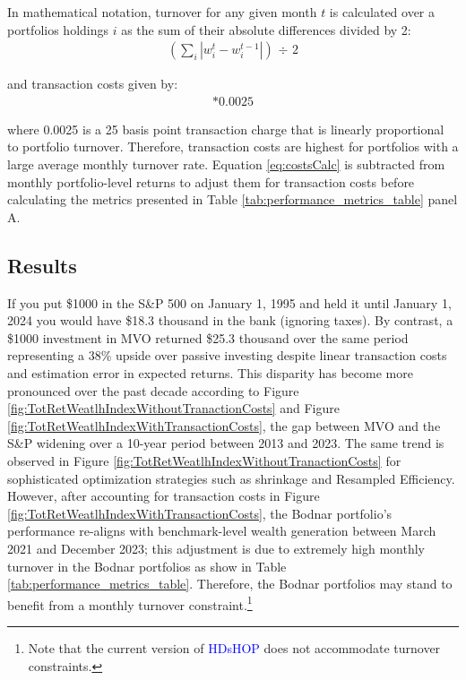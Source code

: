 \documentclass[12pt,letterpaper]{article}
\begin{document}
\clearpage

In mathematical notation, turnover for any given month $t$ is calculated over a portfolios holdings $i$ as the sum of their absolute differences divided by 2:
\begin{align}
(\sum_{i} | w_i^{t} - w_i^{t-1} |) \text{ ÷ } 2
\label{eq:turnoverCalc}
\end{align}

and transaction costs given by:
\begin{align}
[(\sum_{i} | w_i^{t} - w_i^{t-1} |) \text{ ÷ } 2]*0.0025
\label{eq:costsCalc}
\end{align}

where 0.0025 is a 25 basis point transaction charge that is linearly proportional to portfolio turnover. Therefore, transaction costs are highest for portfolios with a large average monthly turnover rate. Equation \ref{eq:costsCalc} is subtracted from monthly portfolio-level returns to adjust them for transaction costs before calculating the metrics presented in Table \ref{tab:performance_metrics_table} panel A.

\subsection{Results}

If you put \$1000 in the S\&P 500 on January 1, 1995 and held it until January 1, 2024 you would have \$18.3 thousand in the bank (ignoring taxes). By contrast, a \$1000 investment in MVO returned \$25.3 thousand over the same period representing a 38\% upside over passive investing despite linear transaction costs and estimation error in expected returns. This disparity has become more pronounced over the past decade according to Figure \ref{fig:TotRetWeatlhIndexWithoutTranactionCosts} and Figure \ref{fig:TotRetWeatlhIndexWithTransactionCosts}, the gap between MVO and the S\&P widening over a 10-year period between 2013 and 2023. The same trend is observed in Figure \ref{fig:TotRetWeatlhIndexWithoutTranactionCosts} for sophisticated optimization strategies such as shrinkage and Resampled Efficiency. However, after accounting for transaction costs in Figure \ref{fig:TotRetWeatlhIndexWithTransactionCosts}, the Bodnar portfolio's performance re-aligns with benchmark-level wealth generation between March 2021 and December 2023; this adjustment is due to extremely high monthly turnover in the Bodnar portfolios as show in Table \ref{tab:performance_metrics_table}. Therefore, the Bodnar portfolios may stand to benefit from a monthly turnover constraint.\footnote{Note that the current version of \textcolor{blue}{HDsHOP} does not accommodate turnover constraints.}
\end{document}
